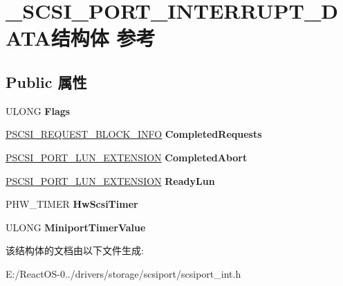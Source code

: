\hypertarget{struct___s_c_s_i___p_o_r_t___i_n_t_e_r_r_u_p_t___d_a_t_a}{}\section{\+\_\+\+S\+C\+S\+I\+\_\+\+P\+O\+R\+T\+\_\+\+I\+N\+T\+E\+R\+R\+U\+P\+T\+\_\+\+D\+A\+T\+A结构体 参考}
\label{struct___s_c_s_i___p_o_r_t___i_n_t_e_r_r_u_p_t___d_a_t_a}
\subsection*{Public 属性}
\begin{DoxyCompactItemize}
\item 
\mbox{\label{struct___s_c_s_i___p_o_r_t___i_n_t_e_r_r_u_p_t___d_a_t_a_a3f44c6676a398827d84cfedd0910d9b0}} 
U\+L\+O\+NG {\bfseries Flags}
\item 
\mbox{\label{struct___s_c_s_i___p_o_r_t___i_n_t_e_r_r_u_p_t___d_a_t_a_a8256dcba939f006596622abe74339a9a}} 
\hyperlink{struct___s_c_s_i___r_e_q_u_e_s_t___b_l_o_c_k___i_n_f_o}{P\+S\+C\+S\+I\+\_\+\+R\+E\+Q\+U\+E\+S\+T\+\_\+\+B\+L\+O\+C\+K\+\_\+\+I\+N\+FO} {\bfseries Completed\+Requests}
\item 
\mbox{\label{struct___s_c_s_i___p_o_r_t___i_n_t_e_r_r_u_p_t___d_a_t_a_a2f2d74b65ab69014c7fd5732eb54ae75}} 
\hyperlink{struct___s_c_s_i___p_o_r_t___l_u_n___e_x_t_e_n_s_i_o_n}{P\+S\+C\+S\+I\+\_\+\+P\+O\+R\+T\+\_\+\+L\+U\+N\+\_\+\+E\+X\+T\+E\+N\+S\+I\+ON} {\bfseries Completed\+Abort}
\item 
\mbox{\label{struct___s_c_s_i___p_o_r_t___i_n_t_e_r_r_u_p_t___d_a_t_a_a1a5a7632adb3c387e93860ffd1e70b1b}} 
\hyperlink{struct___s_c_s_i___p_o_r_t___l_u_n___e_x_t_e_n_s_i_o_n}{P\+S\+C\+S\+I\+\_\+\+P\+O\+R\+T\+\_\+\+L\+U\+N\+\_\+\+E\+X\+T\+E\+N\+S\+I\+ON} {\bfseries Ready\+Lun}
\item 
\mbox{\label{struct___s_c_s_i___p_o_r_t___i_n_t_e_r_r_u_p_t___d_a_t_a_a708f65ba7cb21f9ee2825c60cc4d211c}} 
P\+H\+W\+\_\+\+T\+I\+M\+ER {\bfseries Hw\+Scsi\+Timer}
\item 
\mbox{\label{struct___s_c_s_i___p_o_r_t___i_n_t_e_r_r_u_p_t___d_a_t_a_ad413d92b9f48fed725fc56b03073468b}} 
U\+L\+O\+NG {\bfseries Miniport\+Timer\+Value}
\end{DoxyCompactItemize}


该结构体的文档由以下文件生成\+:\begin{DoxyCompactItemize}
\item 
E\+:/\+React\+O\+S-\/0../drivers/storage/scsiport/scsiport\+\_\+int.\+h\end{DoxyCompactItemize}
